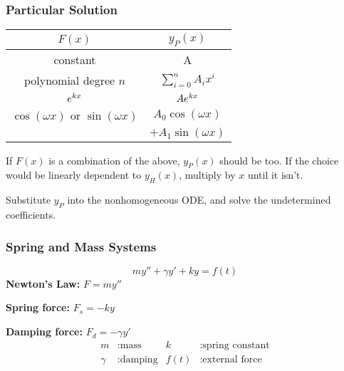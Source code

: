 \documentclass{article}
\begin{document}
\begin{multicols}{3}
    \subsubsection*{Particular Solution}
    \begin{table}[H]
        \centering
        \begin{tabular}{c | c}
            \toprule
            $F(x)$                                                             & $y_P(x)$                                                                \\
            \midrule
            constant                                                         & A                                                                       \\
            polynomial degree $n$                                         & $\displaystyle \sum_{i = 0}^n A_i x^i$                                  \\
            $e^{kx}$                                                          & $A e^{kx}$                                                             \\
            $\cos{\left( \omega x \right)}$ or $\sin{\left( \omega x \right)}$ & $A_0 \cos{\left( \omega x \right)}$ \\ & $+ A_1 \sin{\left( \omega x \right)}$ \\
            \bottomrule
        \end{tabular}
    \end{table}
    If $F(x)$ is a combination of the above, $y_P(x)$ should be too.
    If the choice would be linearly dependent to $y_H(x)$, multiply by $x$ until it isn't.

    Substitute $y_P$ into the nonhomogeneous ODE, and solve the undetermined coefficients.
    \subsubsection*{Spring and Mass Systems}
    \begin{equation*}
        m y'' + \gamma y' + k y = f(t)
    \end{equation*}
    \textbf{Newton's Law:} $F = m y''$

    \textbf{Spring force:} $F_s = -k y$

    \textbf{Damping force:} $F_d = -\gamma y'$
    \begin{align*}
        m      & : \text{mass}    & k    & : \text{spring constant} \\
        \gamma & : \text{damping} & f(t) & : \text{external force}
    \end{align*}

\end{multicols}
\end{document}
